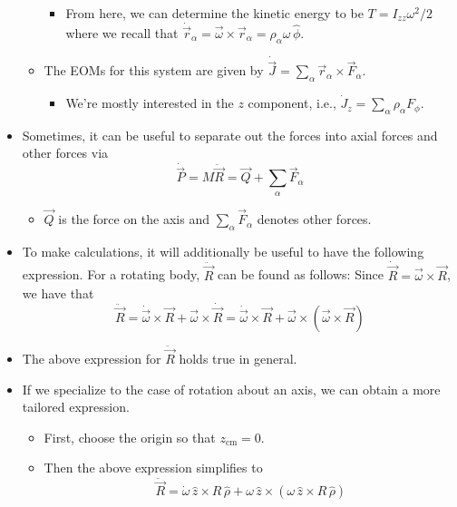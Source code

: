 \documentclass[../notes.tex]{subfiles}
\begin{document}
\begin{itemize}
\begin{itemize}
\begin{itemize}
            \item From here, we can determine the kinetic energy to be $T=I_{zz}\omega^2/2$ where we recall that $\dot{\vec{r}}_\alpha=\vec{\omega}\times\vec{r}_\alpha=\rho_\alpha\omega\,\hat{\phi}$.
        \end{itemize}
        \item The EOMs for this system are given by $\dot{\vec{J}}=\sum_\alpha\vec{r}_\alpha\times\vec{F}_\alpha$.
        \begin{itemize}
            \item We're mostly interested in the $z$ component, i.e., $\dot{J}_z=\sum_\alpha\rho_\alpha F_\phi$.
        \end{itemize}
    \end{itemize}
    \item Sometimes, it can be useful to separate out the forces into axial forces and other forces via
    \begin{equation*}
        \dot{\vec{P}} = M\ddot{\vec{R}}
        = \vec{Q}+\sum_\alpha\vec{F}_\alpha
    \end{equation*}
    \begin{itemize}
        \item $\vec{Q}$ is the force on the axis and $\sum_\alpha\vec{F}_\alpha$ denotes other forces.
    \end{itemize}
    \item To make calculations, it will additionally be useful to have the following expression. For a rotating body, $\ddot{\vec{R}}$ can be found as follows: Since $\dot{\vec{R}}=\vec{\omega}\times\vec{R}$, we have that
    \begin{equation*}
        \ddot{\vec{R}} = \dot{\vec{\omega}}\times\vec{R}+\vec{\omega}\times\dot{\vec{R}}
        = \dot{\vec{\omega}}\times\vec{R}+\vec{\omega}\times(\vec{\omega}\times\vec{R})
    \end{equation*}
    \item The above expression for $\ddot{\vec{R}}$ holds true in general.
    \item If we specialize to the case of rotation about an axis, we can obtain a more tailored expression.
    \begin{itemize}
        \item First, choose the origin so that $z_\text{cm}=0$.
        \item Then the above expression simplifies to
        \begin{equation*}
            \ddot{\vec{R}} = \dot{\omega}\,\hat{z}\times R\,\hat{\rho}+\omega\,\hat{z}\times(\omega\,\hat{z}\times R\,\hat{\rho})

\end{equation*}
\end{itemize}
\end{itemize}
\end{document}
